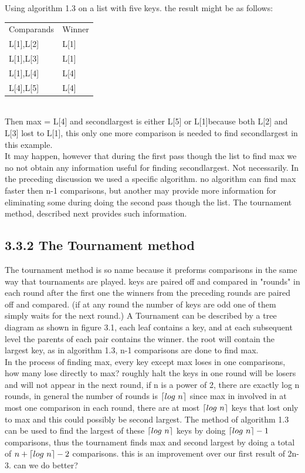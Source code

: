 \documentclass[a4paper,10pt,titlepage]{report}
\DeclarePairedDelimiter{\ceil}{\lceil}{\rceil}
\begin{document}
Using algorithm 1.3 on a list with five keys. the result might be as follows:\\
\begin{tabular}{ll}
Comparands & Winner \\
L{[}1{]},L{[}2{]} & L{[}1{]} \\
L{[}1{]},L{[}3{]} & L{[}1{]} \\
L{[}1{]},L{[}4{]} & L{[}4{]} \\
L{[}4{]},L{[}5{]} & L{[}4{]}
\end{tabular}
\\
Then max = L[4] and secondlargest is either L[5] or L[1]because both L[2] and L[3] lost to L[1], this only one more comparison is needed to find secondlargest in this example.\\
It may happen, however that during the first pass though the list to find max we no not obtain any information useful for finding secondlargest. Not necessarily. In the preceding discussion we used a specific algorithm. no algorithm can find max faster then n-1 comparisons, but another may provide more information for eliminating some during doing the second pass though the list. The tournament method, described next provides such information.\\
\subsection{3.3.2 The Tournament method}
The tournament method is so name because it preforms comparisons in the same way that tournaments are played. keys are paired off and compared in "rounds" in each round after the first one the winners from the preceding rounds are paired off and compared. (if at any round the number of keys are odd one of them simply waits for the next round.) A Tournament can be described by a tree diagram as shown in figure 3.1, each leaf contains a key, and at each subsequent level the parents of each pair contains the winner. the root will contain the largest key, as in algorithm 1.3, n-1 comparisons are done to find max.\\
In the process of finding max, every key except max loses in one comparisons, how many lose directly to max? roughly halt the keys in one round will be losers and will not appear in the next round, if n is a power of 2, there are exactly log n rounds, in general the number of rounds is $\ceil{log \ n }$ since max in involved in at most one comparison in each round, there are at most $\ceil{log \ n }$ keys that lost only to max and this could possibly be second largest. The method of algorithm 1.3 can be used to find the largest of these $\ceil{log \ n}$ keys by doing $\ceil{log \ n} -1$ comparisons, thus the tournament finds max and second largest by doing a total of $n+\ceil{log \ n} -2$ comparisons. this is an improvement over our first result of 2n-3. can we do better?
\end{document}

